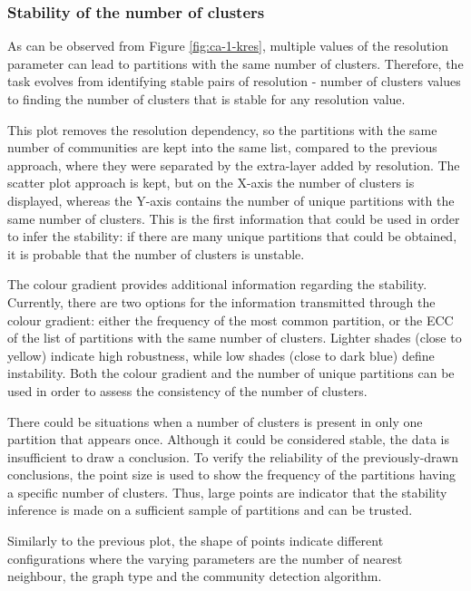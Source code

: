 \subsubsection{Stability of the number of clusters}
As can be observed from Figure \ref{fig:ca-1-kres}, multiple values of the resolution parameter can lead to partitions with the same number of clusters. Therefore, the task evolves from identifying stable pairs of resolution - number of clusters values to finding the number of clusters that is stable for any resolution value.

This plot removes the resolution dependency, so the partitions with the same number of communities are kept into the same list, compared to the previous approach, where they were separated by the extra-layer added by resolution. The scatter plot approach is kept, but on the X-axis the number of clusters is displayed, whereas the Y-axis contains the number of unique partitions with the same number of clusters. This is the first information that could be used in order to infer the stability: if there are many unique partitions that could be obtained, it is probable that the number of clusters is unstable.

The colour gradient provides additional information regarding the stability. Currently, there are two options for the information transmitted through the colour gradient: either the frequency of the most common partition, or the ECC of the list of partitions with the same number of clusters. Lighter shades (close to yellow) indicate high robustness, while low shades (close to dark blue) define instability. Both the colour gradient and the number of unique partitions can be used in order to assess the consistency of the number of clusters.

There could be situations when a number of clusters is present in only one partition that appears once. Although it could be considered stable, the data is insufficient to draw a conclusion. To verify the reliability of the previously-drawn conclusions, the point size is used to show the frequency of the partitions having a specific number of clusters. Thus, large points are indicator that the stability inference is made on a sufficient sample of partitions and can be trusted.

Similarly to the previous plot, the shape of points indicate different configurations where the varying parameters are the number of nearest neighbour, the graph type and the community detection algorithm.

